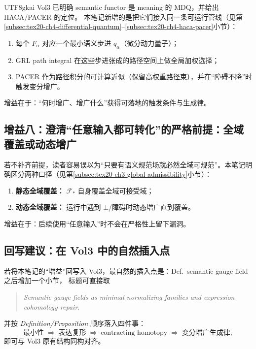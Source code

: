 \documentclass[12pt]{article}
\begin{document}
\begin{CJK*}{UTF8}{gkai}
Vol3 已明确 semantic functor 是 meaning 的 \textsf{MDQ}，并给出 \textsf{HACA}/\textsf{PACER} 的定位。\cite{GaoZhengAppVol3}
本笔记新增的是把它们接入同一条可运行管线（见第\ref{subsec:tex20-ch4-differential-quantum}--\ref{subsec:tex20-ch4-haca-pacer}小节）：
\begin{enumerate}
  \item 每个 $F_\alpha$ 对应一个最小语义步进 $q_\alpha$（微分动力量子）；
  \item \textsf{GRL} path integral 在这些步进张成的路径空间上做全局加权选择；
  \item \textsf{PACER} 作为路径积分的可计算近似（保留高权重路径束），并在“障碍不降”时触发变分增广。
\end{enumerate}
增益在于：“何时增广、增广什么”获得可落地的触发条件与生成律。

\subsection{增益八：澄清“任意输入都可转化”的严格前提：全域覆盖或动态增广}
\label{subsec:tex20-ch5-gain8}

若不补齐前提，读者容易误以为“只要有语义规范场就必然全域可规范”。本笔记明确区分两种口径（见第\ref{subsec:tex20-ch3-global-admissibility}小节）：
\begin{enumerate}
  \item \textbf{静态全域覆盖：} $\mathcal{F}_\ast$ 自身覆盖全域可接受域；
  \item \textbf{动态全域覆盖：} 运行中遇到 $\bot$/障碍时动态增广直到覆盖。
\end{enumerate}
增益在于：后续使用“任意输入”时不会在严格性上留下漏洞。

\subsection{回写建议：在 Vol3 中的自然插入点}
\label{subsec:tex20-ch5-writeback}

若将本笔记的“增益”回写入 Vol3，最自然的插入点是：Def.\ semantic gauge field 之后增加一个小节，
标题可直接取
\begin{quote}
  \textit{Semantic gauge fields as minimal normalizing families and expression cohomology repair}.
\end{quote}
并按 \emph{Definition/Proposition} 顺序落入四件事：
\[
\text{最小性}\;\Rightarrow\;\text{表达复形}\;\Rightarrow\;\text{contracting homotopy}\;\Rightarrow\;\text{变分增广生成律},
\]
即可与 Vol3 原有结构同构对齐。\cite{GaoZhengAppVol3}


\end{CJK*}
\end{document}
